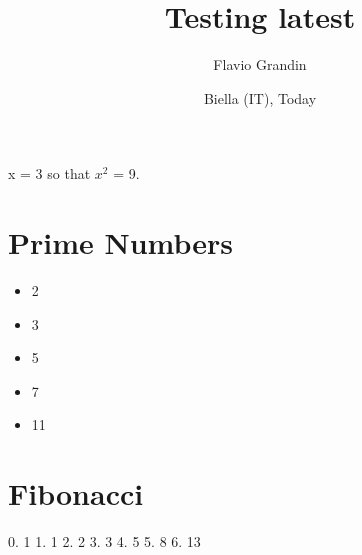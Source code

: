 \documentclass{article}
\title{Testing latest}
\author{Flavio Grandin}
\date{Biella (IT), Today}
\begin{document}
x = 3 so that $x^2$ = 9.
\section{Prime Numbers}
\begin{itemize}
\item 2
\item 3
\item 5
\item 7
\item 11
\end{itemize}
\section{Fibonacci}
0. 1
1. 1
2. 2
3. 3
4. 5
5. 8
6. 13
\end{document}
